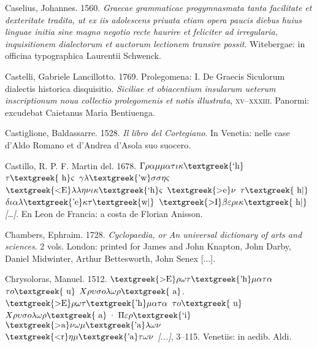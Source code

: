 \begin{styleStandard}
Caselius, Johannes. 1560. \textit{Graecae grammaticae progymnasmata tanta facilitate et dexteritate tradita, ut ex iis adolescens priuata etiam opera paucis diebus huius linguae initia sine magno negotio recte haurire et feliciter ad irregularia, inquisitionem dialectorum et auctorum lectionem transire possit}. Witebergae: in officina typographica Laurentii Schwenck.
\end{styleStandard}

\begin{styleStandard}
Castelli, Gabriele Lancillotto. 1769. Prolegomena: I. De Graecis Siculorum dialectis historica disquisitio. \textit{Siciliae et obiacentium insularum ueterum inscriptionum noua collectio prolegomenis et notis illustrata}, \textsc{xv}–\textsc{xxxiii}. Panormi: excudebat Caietanus Maria Bentiuenga.
\end{styleStandard}

\begin{styleStandard}
Castiglione, Baldassarre. 1528. \textit{Il libro del Cortegiano}. In Venetia: nelle case d’Aldo Romano et d’Andrea d’Asola suo suocero.
\end{styleStandard}

\begin{styleStandard}
Castillo, R. P. F. Martin del. 1678. \textit{$\Gamma \rho \alpha \mu \mu \alpha \tau \iota \kappa \text{\textgreek{`h}}$ $\tau \text{\textgreek{~h}}\varsigma $ $\gamma \lambda \text{\textgreek{'w}}\sigma \sigma \eta \varsigma $ $\text{\textgreek{<E}}\lambda \lambda \eta \nu \iota \kappa \text{\textgreek{`h}}\varsigma $ $\text{\textgreek{>e}}\nu $ $\tau \text{\textgreek{~h|}}$ $\delta \iota \alpha \lambda \text{\textgreek{'e}}\kappa \tau \text{\textgreek{w|}}$ $\text{\textgreek{>I}}\beta \varepsilon \rho \iota \kappa \text{\textgreek{~h|}}$ […]}. En Leon de Francia: a costa de Florian Anisson.
\end{styleStandard}

\begin{styleStandard}
Chambers, Ephraim. 1728. \textit{Cyclopaedia, or An universal dictionary of arts and sciences}. 2 vols. London: printed for James and John Knapton, John Darby, Daniel Midwinter, Arthur Bettesworth, John Senex [...].
\end{styleStandard}

\begin{styleStandard}
Chrysoloras, Manuel. 1512. $\text{\textgreek{>E}}\rho \omega \tau \text{\textgreek{'h}}\mu \alpha \tau \alpha $ $\tau o\text{\textgreek{~u}}$ $X\rho \upsilon \sigma o\lambda \omega \rho \text{\textgreek{~a}}$. \textit{$\text{\textgreek{>E}}\rho \omega \tau \text{\textgreek{'h}}\mu \alpha \tau \alpha $ $\tau o\text{\textgreek{~u}}$ $X\rho \upsilon \sigma o\lambda \omega \rho \text{\textgreek{~a}}$· $\Pi \varepsilon \rho \text{\textgreek{`i}}$ $\text{\textgreek{>a}}\nu \omega \mu \text{\textgreek{'a}}\lambda \omega \nu $ $\text{\textgreek{<r}}\eta \mu \text{\textgreek{'a}}\tau \omega \nu $ [...]}, 3–115. Venetiis: in aedib. Aldi.
\end{styleStandard}

